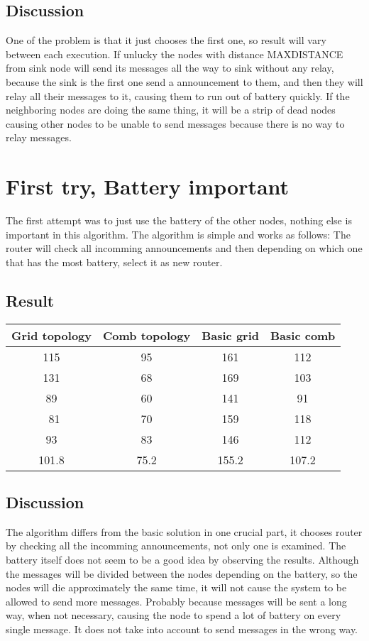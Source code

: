 \documentclass{article}
\begin{document}
  \subsection{Discussion}
   One of the problem is that it just chooses the first one,
   so result will vary between each execution.
   If unlucky the nodes with distance MAXDISTANCE from
   sink node will send its messages all the way to sink
   without any relay, because the sink is the first one
   send a announcement to them, and then they will relay
   all their messages to it, causing them to run out of
   battery quickly. If the neighboring nodes
   are doing the same thing, it will be a strip of dead
   nodes causing other nodes to be unable to send messages
   because there is no way to relay messages.

\section{First try, Battery important}
  The first attempt was to just use the battery of the other nodes, 
  nothing else is important in this algorithm. The algorithm is simple
  and works as follows: The router will check all incomming announcements
  and then depending on which one that has the most battery, select it as
  new router.  
  \subsection{Result}
    \begin{tabular}{c|c||c|c}
      Grid topology & Comb topology & Basic grid & Basic comb\\
      \hline
      \hline
      115 & 95 & 161 & 112\\
      131 & 68 & 169 & 103\\
      89  & 60 & 141 & 91\\\
      81  & 70 & 159 & 118\\
      93  & 83 & 146 & 112\\
      \hline
      101.8&75.2&155.2&107.2\\

      
    \end{tabular}
  \subsection{Discussion}
    The algorithm differs from the basic solution in one crucial part, it chooses
    router by checking all the incomming announcements, not only one is examined.
    The battery itself does not seem to be a good idea by observing the results.
    Although the messages will be divided between the nodes depending on the battery,
    so the nodes will die approximately the same time, it will not cause the
    system to be allowed to send more messages. Probably because messages will be sent
    a long way, when not necessary, causing the node to spend a lot of battery on
    every single message.
    It does not take into account to send messages in the wrong way.
\end{document}
